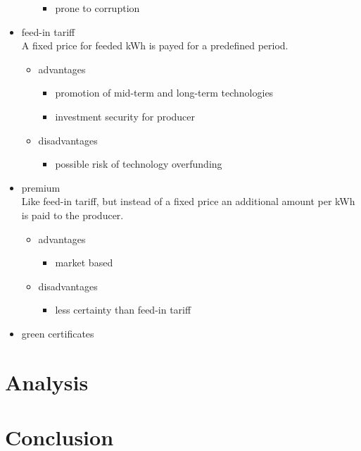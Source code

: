 \documentclass{article}
\begin{document}
\begin{itemize}
\begin{itemize}
\begin{itemize}
\item prone to corruption
\end{itemize}
\end{itemize}
\item feed-in tariff\\
A fixed price for feeded kWh is payed for a predefined period.
\begin{itemize}
\item advantages
\begin{itemize}
\item promotion of mid-term and long-term technologies
\item investment security for producer
\end{itemize}
\item disadvantages
\begin{itemize}
\item possible risk of technology overfunding
\end{itemize}
\end{itemize}
\item premium\\
Like feed-in tariff, but instead of a fixed price an additional amount per kWh is paid to the producer.
\begin{itemize}
\item advantages
\begin{itemize}
\item market based
\end{itemize}
\item disadvantages
\begin{itemize}
\item less certainty than feed-in tariff
\end{itemize}
\end{itemize}
\item green certificates
\end{itemize}

\section{Analysis}

\newpage
\section{Conclusion}
\end{document}

